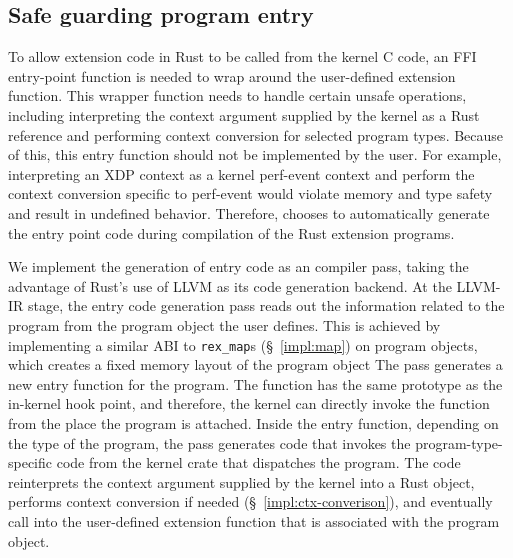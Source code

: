 \subsection{Safe guarding program entry}
To allow \projname{} extension code in Rust to be called from the kernel C
    code, an FFI entry-point function is needed to wrap around the user-defined
    extension function.
This wrapper function needs to handle certain unsafe operations, including
    interpreting the context argument supplied by the kernel as a Rust
    reference and performing context conversion for selected program types.
Because of this, this entry function should not be implemented by the user.
For example, interpreting an XDP context as a kernel perf-event context and
    perform the context conversion specific to perf-event would violate memory
    and type safety and result in undefined behavior.
Therefore, \projname{} chooses to automatically generate the entry point code
    during compilation of the Rust extension programs.

We implement the generation of entry code as an compiler pass, taking the
    advantage of Rust's use of LLVM as its code generation backend.
At the LLVM-IR stage, the entry code generation pass reads out the information
    related to the program from the program object the user defines.
This is achieved by implementing a similar ABI to \texttt{rex\_map}s
    (\S~\ref{impl:map}) on program objects, which creates a fixed memory layout
    of the program object
The pass generates a new entry function for the program.
The function has the same prototype as the in-kernel hook point, and therefore,
    the kernel can directly invoke the function from the place the program is
    attached.
Inside the entry function, depending on the type of the program, the pass
    generates code that invokes the program-type-specific code from the
    \projname{} kernel crate that dispatches the program.
The code reinterprets the context argument supplied by the kernel into a Rust
    object, performs context conversion if needed
    (\S~\ref{impl:ctx-converison}), and eventually call into the
    user-defined extension function that is associated with the \projname{}
    program object.

